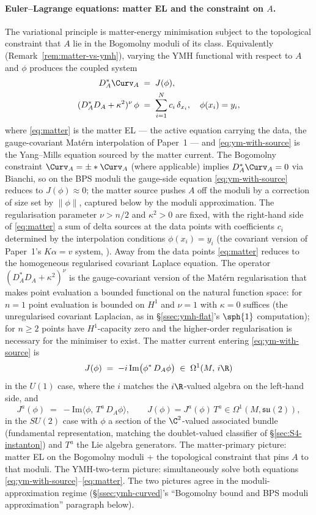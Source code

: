 \paragraph{Euler--Lagrange equations: matter EL and the constraint
on $A$.} The variational principle is matter-energy minimisation
subject to the topological constraint that $A$ lie in the Bogomolny
moduli of its class. Equivalently
(Remark~\ref{rem:matter-vs-ymh}), varying the YMH functional with
respect to $A$ and $\phi$ produces the coupled system
\begin{align}
   D_A^*\Curv_A &\;=\; J(\phi), \label{eq:ym-with-source}\\
   (D_A^*D_A+\kappa^2)^\nu\,\phi &\;=\; \sum_{i=1}^N c_i\,\delta_{x_i},
   \quad \phi(x_i)=y_i,
   \label{eq:matter}
\end{align}
where \eqref{eq:matter} is the matter EL --- the active equation
carrying the data, the gauge-covariant Mat\'ern interpolation of
Paper~1 --- and \eqref{eq:ym-with-source} is the Yang--Mills equation
sourced by the matter current. The Bogomolny constraint
$\Curv_A=\pm*\Curv_A$ (where applicable) implies
$D_A^*\Curv_A=0$ via Bianchi, so on the BPS moduli the
gauge-side equation \eqref{eq:ym-with-source} reduces to
$J(\phi)\approx 0$; the matter source pushes $A$ off the moduli by a
correction of size set by $\|\phi\|$, captured below by the moduli
approximation. The regularisation
parameter $\nu>n/2$ and $\kappa^2>0$ are fixed, with the
right-hand side of \eqref{eq:matter} a sum of delta sources at the
data points with coefficients $c_i$ determined by the interpolation
conditions $\phi(x_i)=y_i$ (the covariant version of Paper~1's
$K\alpha=v$ system, \cite[Theorem~13.3]{Vasii2026Paper1}). Away from
the data points \eqref{eq:matter} reduces to the homogeneous
regularised covariant Laplace equation. The operator
$(D_A^*D_A+\kappa^2)^\nu$ is the gauge-covariant version of the
Mat\'ern regularisation \cite{Vasii2026Paper1} that makes point
evaluation a bounded functional on the natural function space: for
$n=1$ point evaluation is bounded on $H^1$ and $\nu=1$ with
$\kappa=0$ suffices (the unregularised covariant Laplacian, as in
\S\ref{ssec:ymh-flat}'s $\sph{1}$ computation); for $n\geq 2$ points
have $H^1$-capacity zero and the higher-order regularisation is
necessary for the minimiser to exist. The matter current entering
\eqref{eq:ym-with-source} is
\[
   J(\phi) \;=\; -i\,\mathrm{Im}\bigl(\phi^*\,D_A\phi\bigr)
   \;\in\; \Omega^1(M,\,i\R)
\]
in the $U(1)$ case, where the $i$ matches the $i\R$-valued algebra
on the left-hand side, and
\[
   J^a(\phi) \;=\; -\mathrm{Im}\bigl\langle\phi,\,T^a\,D_A\phi
   \bigr\rangle, \qquad J(\phi)=J^a(\phi)\,T^a\in\Omega^1(M,\mathfrak{su}(2)),
\]
in the $SU(2)$ case with $\phi$ a section of the
$\C^2$-valued associated bundle (fundamental representation, matching
the doublet-valued classifier of \S\ref{sec:S4-instanton}) and
$T^a$ the Lie algebra generators. The matter-primary picture: matter
EL on the Bogomolny moduli + the topological constraint that pins
$A$ to that moduli. The YMH-two-term picture: simultaneously solve
both equations \eqref{eq:ym-with-source}--\eqref{eq:matter}. The two
pictures agree in the moduli-approximation regime
(\S\ref{ssec:ymh-curved}'s ``Bogomolny bound and BPS moduli
approximation'' paragraph below).

